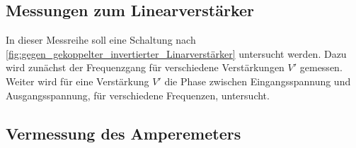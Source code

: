 \subsection{Messungen zum Linearverstärker}
In dieser Messreihe soll eine Schaltung nach \cref{fig:gegen_gekoppelter_invertierter_Linarverstärker} untersucht werden.
Dazu wird zunächst der Frequenzgang für verschiedene Verstärkungen $V'$ gemessen.
Weiter wird für eine Verstärkung $V'$ die Phase zwischen Eingangsspannung und Ausgangsspannung, für verschiedene Frequenzen, untersucht.
\subsection{Vermessung des Amperemeters}

